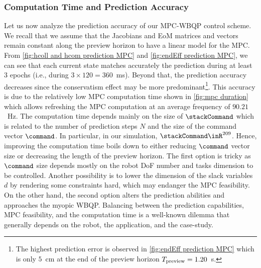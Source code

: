 \subsubsection{Computation Time and Prediction Accuracy} 
Let us now analyze the prediction accuracy of our MPC-WBQP control scheme. We recall that we assume that the Jacobians and EoM matrices and vectors remain constant along the preview horizon to have a linear model for the MPC. From \cref{fig:hcoll and hcom  prediction MPC} and \cref{fig:endEff prediction MPC}, we can see that each current state matches accurately the prediction during at least 3 epochs (i.e., during $3\times 120 = 360$~ms). Beyond that, the prediction accuracy decreases since the conservatism effect may be more predominant\footnote{The highest prediction error is observed in \cref{fig:endEff prediction MPC} which is only $5$~cm at the end of the preview horizon $T_{\rm preview}=1.20$~s.}. This accuracy is due to the relatively low MPC computation time shown in \cref{fig:mpc duration} which allows refreshing the MPC computation at an average frequency of $90.21$~Hz. The computation time depends mainly on the size of $\stackCommand$ which is related to the number of prediction steps $N$ and the size of the command vector $\command$. In particular, in our simulation, $\stackCommand\inR^{209}$. Hence, improving the computation time boils down to either reducing $\command$ vector size or decreasing the length of the preview horizon. The first option is tricky as $\command$ size depends mostly on the robot DoF number and tasks dimension to be controlled. Another possibility is to lower the dimension of the slack variables $d$  by rendering some constraints hard, which may endanger the MPC feasibility. On the other hand, the second option alters the prediction abilities and approaches the myopic WBQP. Balancing between the prediction capabilities, MPC feasibility, and the computation time is a well-known dilemma that generally depends on the robot, the application, and the case-study.    



